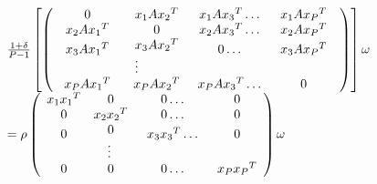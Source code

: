 \documentclass[journal]{IEEEtran}
\begin{document}
\begin{scriptsize}
\begin{equation}
\begin{array}{l}
\frac{{1 + \delta }}{{P - 1}}\left[ {\left( {\begin{array}{*{20}{c}}
0&{{x_1}A{x_2}^T}&{{x_1}A{x_3}^T \ldots }&{{x_1}A{x_P}^T}\\
{{x_2}A{x_1}^T}&0&{{x_2}A{x_3}^T \ldots }&{{x_2}A{x_P}^T}\\
\begin{array}{l}
{x_3}A{x_1}^T\\
{\rm{    }}
\end{array}&\begin{array}{l}
{x_3}A{x_2}^T\\
{\rm{     }} \vdots
\end{array}&\begin{array}{l}
{\rm{    }}0{\rm{  }} \ldots \\
{\rm{    }}
\end{array}&\begin{array}{l}
{x_3}A{x_P}^T\\
{\rm{   }}
\end{array}\\
{{x_P}A{x_1}^T}&{{x_P}A{x_2}^T}&{{x_P}A{x_3}^T \ldots }&0
\end{array}} \right)} \right]\omega \\
 = \rho \left( {\begin{array}{*{20}{c}}
{{x_1}{x_1}^T}&0&{0 \ldots }&0\\
0&{{x_2}{x_2}^T}&{0 \ldots }&0\\
\begin{array}{l}
{\rm{ }}0\\
{\rm{   }}
\end{array}&\begin{array}{l}
{\rm{  }}0\\
{\rm{     }} \vdots
\end{array}&\begin{array}{l}
{\rm{    }}{x_3}{x_3}^T \ldots \\
{\rm{    }}
\end{array}&\begin{array}{l}
{\rm{ }}0\\
{\rm{   }}
\end{array}\\
0&0&{0 \ldots }&{{x_P}{x_P}^T}
\end{array}} \right)\omega
\end{array}
\end{equation}
\end{scriptsize}
\end{document}
